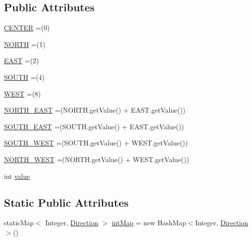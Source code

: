 \subsection*{Public Attributes}
\begin{DoxyCompactItemize}
\item 
\hyperlink{enumorg_1_1tzi_1_1use_1_1gui_1_1views_1_1diagrams_1_1util_1_1_direction_ab980fc4f620c5920e939f816e1a0139a}{C\-E\-N\-T\-E\-R} =(0)
\item 
\hyperlink{enumorg_1_1tzi_1_1use_1_1gui_1_1views_1_1diagrams_1_1util_1_1_direction_a7cd10722c42ae81116a6b28d6cfd1945}{N\-O\-R\-T\-H} =(1)
\item 
\hyperlink{enumorg_1_1tzi_1_1use_1_1gui_1_1views_1_1diagrams_1_1util_1_1_direction_aac80ac44b96569997e2ba76091caebd6}{E\-A\-S\-T} =(2)
\item 
\hyperlink{enumorg_1_1tzi_1_1use_1_1gui_1_1views_1_1diagrams_1_1util_1_1_direction_a6c985c142a7a83764ded55846b70099e}{S\-O\-U\-T\-H} =(4)
\item 
\hyperlink{enumorg_1_1tzi_1_1use_1_1gui_1_1views_1_1diagrams_1_1util_1_1_direction_a668f50bff546f551535db3cf801de447}{W\-E\-S\-T} =(8)
\item 
\hyperlink{enumorg_1_1tzi_1_1use_1_1gui_1_1views_1_1diagrams_1_1util_1_1_direction_ae70c40ae91d0ad9d81b8a3392a042bc8}{N\-O\-R\-T\-H\-\_\-\-E\-A\-S\-T} =(N\-O\-R\-T\-H.\-get\-Value() + E\-A\-S\-T.\-get\-Value())
\item 
\hyperlink{enumorg_1_1tzi_1_1use_1_1gui_1_1views_1_1diagrams_1_1util_1_1_direction_aed70b0d431e0b24a6e4b11fe559d7245}{S\-O\-U\-T\-H\-\_\-\-E\-A\-S\-T} =(S\-O\-U\-T\-H.\-get\-Value() + E\-A\-S\-T.\-get\-Value())
\item 
\hyperlink{enumorg_1_1tzi_1_1use_1_1gui_1_1views_1_1diagrams_1_1util_1_1_direction_af4b9aa63ec323f03e0437c726c83f371}{S\-O\-U\-T\-H\-\_\-\-W\-E\-S\-T} =(S\-O\-U\-T\-H.\-get\-Value() + W\-E\-S\-T.\-get\-Value())
\item 
\hyperlink{enumorg_1_1tzi_1_1use_1_1gui_1_1views_1_1diagrams_1_1util_1_1_direction_a61846d30d085febab60863ac2bf9c012}{N\-O\-R\-T\-H\-\_\-\-W\-E\-S\-T} =(N\-O\-R\-T\-H.\-get\-Value() + W\-E\-S\-T.\-get\-Value())
\item 
int \hyperlink{enumorg_1_1tzi_1_1use_1_1gui_1_1views_1_1diagrams_1_1util_1_1_direction_a768d8dfd1377fb7ca62f8b910f7446f5}{value}
\end{DoxyCompactItemize}
\subsection*{Static Public Attributes}
\begin{DoxyCompactItemize}
\item 
static\-Map$<$ Integer, \hyperlink{enumorg_1_1tzi_1_1use_1_1gui_1_1views_1_1diagrams_1_1util_1_1_direction}{Direction} $>$ \hyperlink{enumorg_1_1tzi_1_1use_1_1gui_1_1views_1_1diagrams_1_1util_1_1_direction_aa15c7e41fd8701f9477ac4e3f681bb1d}{int\-Map} = new Hash\-Map$<$Integer, \hyperlink{enumorg_1_1tzi_1_1use_1_1gui_1_1views_1_1diagrams_1_1util_1_1_direction}{Direction}$>$()
\end{DoxyCompactItemize}


